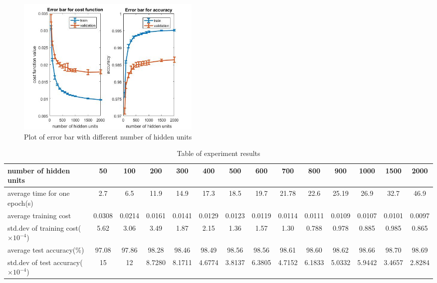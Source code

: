 \documentclass[conference]{IEEEtran}
\begin{document}

\begin{figure}[h!]
\centerline{\includegraphics[width=3.5in]{errorbarAll.jpg}}
\caption{Plot of error bar with different number of hidden units}
\label{errorBar}
\end{figure}

\begin{table}[h!]
\centering
\begin{tabular}{lccccccccccccc}
\hline
number of hidden units & 50 & 100 & 200 & 300 & 400 & 500 & 600 & 700 & 800 & 900 & 1000 & 1500 & 2000\\ \hline
average time for one epoch(s) & 2.7 & 6.5 & 11.9 & 14.9 & 17.3 & 18.5 & 19.7 & 21.78 & 22.6 & 25.19 & 26.9 & 32.7 & 46.9\\
average training cost & 0.0308 & 0.0214 & 0.0161 & 0.0141 &  0.0129 & 0.0123 & 0.0119 & 0.0114 & 0.0111 & 0.0109 & 0.0107 & 0.0101 & 0.0097\\
std.dev of training cost($\times 10^{-4}$) & 5.62 & 3.06 & 3.49 & 1.87&  2.15 & 1.36 & 1.57 & 1.30 & 0.788 & 0.978 & 0.885 & 0.985 & 0.865\\
average test accuracy(\%) &  97.08 &   97.86 &  98.28 & 98.46 & 98.49  & 98.56  & 98.56  & 98.61  & 98.60 &   98.62 & 98.66  & 98.70 & 98.69 \\
std.dev of test accuracy($\times 10^{-4}$) & 15 & 12 & 8.7280 & 8.1711 &  4.6774 & 3.8137 & 6.3805 & 4.7152 & 6.1833 & 5.0332 & 5.9442 & 3.4657 & 2.8284\\
\hline
\end{tabular}
\caption{Table of experiment results}
\label{tab: t1}
\end{table}
\end{document}
